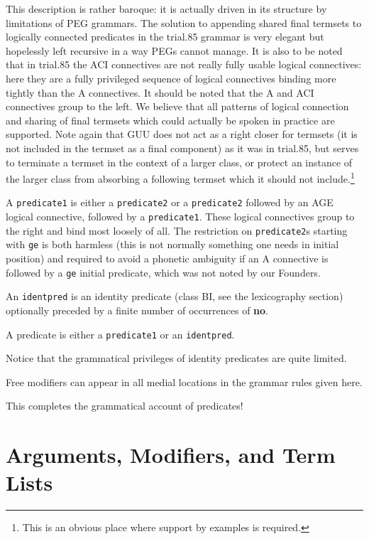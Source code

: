 \documentclass[12pt]{book}
\begin{document}
This description is rather baroque:  it is actually driven in its structure by limitations of PEG grammars.  The solution to appending shared final termsets to logically connected predicates in the trial.85 grammar is very elegant but hopelessly left recursive in a way PEGs cannot manage.  It is also to be noted that in trial.85 the ACI connectives are not really fully usable logical connectives:  here they are a fully privileged sequence of logical connectives binding more tightly than the A connectives.  It should be noted that the A and ACI connectives group to the left.  We believe that all patterns of logical connection and sharing of final termsets which could actually be spoken in practice are supported.  Note again that GUU does not act as a right closer for termsets (it is not included in the termset as a final component) as it was in trial.85, but serves to terminate a termset in the context of a larger class, or protect an instance of the larger class from absorbing a following termset which it should not include.\footnote{This is an obvious place where support by examples is required.}

A {\tt predicate1} is either a {\tt predicate2} or a {\tt predicate2} followed by an AGE logical connective, followed by a {\tt predicate1}.  These
logical connectives group to the right and bind most loosely of all.  The restriction on {\tt predicate2}s starting with {\tt ge} is both harmless
(this is not normally something one needs in initial position) and required to avoid a phonetic ambiguity if an A connective is followed by a {\tt ge} initial predicate, which was not noted by our Founders.

An {\tt identpred} is an identity predicate (class BI, see the lexicography section) optionally preceded by a finite number of occurrences of {\bf no}.

A predicate is either a {\tt predicate1} or an {\tt identpred}.

Notice that the grammatical privileges of identity predicates are quite limited.

Free modifiers can appear in all medial locations in the grammar rules given here.

This completes the grammatical account of predicates!


\newpage

\section{Arguments, Modifiers, and Term Lists}
\end{document}
